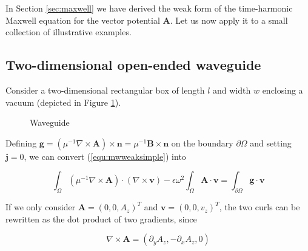 \documentclass[11pt, a4paper]{article}
\begin{document}
In Section \ref{sec:maxwell} we have derived the weak form of the time-harmonic
Maxwell equation for the vector potential $\mathbf{A}$. Let us now apply it to
a small collection of illustrative examples.

\subsection{Two-dimensional open-ended waveguide}
\label{subsec:2dwaveguide}

Consider a two-dimensional rectangular box of length $l$ and width $w$ enclosing
a vacuum (depicted in Figure \ref{fig:waveguide}).

\begin{figure}[h]
    \centering
    \caption{Waveguide}
    \label{fig:waveguide}
\end{figure}

Defining $\mathbf{g} = ({\mu^{-1} \nabla \times \mathbf{A}}) \times \mathbf{n} =
\mu^{-1} \mathbf{B} \times \mathbf{n}$ on the boundary $\partial \Omega$
and setting $\mathbf{j} = 0$, we can convert (\ref{equ:mwweaksimple}) into

\begin{equation}
    \int_{\Omega} (\mu^{-1} \nabla \times \mathbf{A}) \cdot (\nabla \times \mathbf{v})
    - \epsilon \omega^2 \int_{\Omega} \mathbf{A} \cdot \mathbf{v} 
    = \int_{\partial \Omega} \mathbf{g} \cdot \mathbf{v} \label{equ:mwweakwaveguide}
\end{equation}

If we only consider $\mathbf{A} = (0, 0, A_z)^T$ and $\mathbf{v} = (0, 0, v_z)^T$,
the two curls can be rewritten as the dot product of two gradients, since 

\begin{equation}
    \nabla \times \mathbf{A} = (\partial_y A_z, -\partial_x A_z, 0)
\end{equation}
\end{document}
